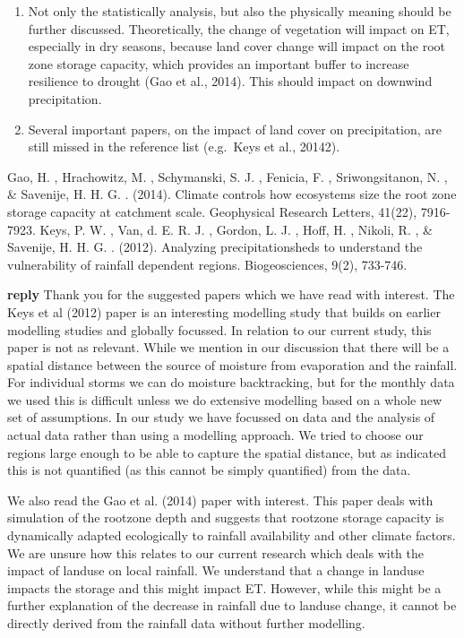 \documentclass[fleqn,10pt,lineno]{wlpeerj} %
\theoremstyle{definition}
\theoremstyle{definition}
\theoremstyle{definition}
\theoremstyle{remark}
\begin{document}
\begin{enumerate}
\def\labelenumi{\arabic{enumi}.}
\item
  Not only the statistically analysis, but also the physically meaning
  should be further discussed. Theoretically, the change of vegetation
  will impact on ET, especially in dry seasons, because land cover
  change will impact on the root zone storage capacity, which provides
  an important buffer to increase resilience to drought (Gao et al.,
  2014). This should impact on downwind precipitation.
\item
  Several important papers, on the impact of land cover on
  precipitation, are still missed in the reference list (e.g.~Keys et
  al., 20142).
\end{enumerate}

Gao, H. , Hrachowitz, M. , Schymanski, S. J. , Fenicia, F. ,
Sriwongsitanon, N. , \& Savenije, H. H. G. . (2014). Climate controls
how ecosystems size the root zone storage capacity at catchment scale.
Geophysical Research Letters, 41(22), 7916-7923. Keys, P. W. , Van, d.
E. R. J. , Gordon, L. J. , Hoff, H. , Nikoli, R. , \& Savenije, H. H. G.
. (2012). Analyzing precipitationsheds to understand the vulnerability
of rainfall dependent regions. Biogeosciences, 9(2), 733-746.

\textbf{reply} Thank you for the suggested papers which we have read
with interest. The Keys et al (2012) paper is an interesting modelling
study that builds on earlier modelling studies and globally focussed. In
relation to our current study, this paper is not as relevant. While we
mention in our discussion that there will be a spatial distance between
the source of moisture from evaporation and the rainfall. For individual
storms we can do moisture backtracking, but for the monthly data we used
this is difficult unless we do extensive modelling based on a whole new
set of assumptions. In our study we have focussed on data and the
analysis of actual data rather than using a modelling approach. We tried
to choose our regions large enough to be able to capture the spatial
distance, but as indicated this is not quantified (as this cannot be
simply quantified) from the data.

We also read the Gao et al. (2014) paper with interest. This paper deals
with simulation of the rootzone depth and suggests that rootzone storage
capacity is dynamically adapted ecologically to rainfall availability
and other climate factors.\\
We are unsure how this relates to our current research which deals with
the impact of landuse on local rainfall. We understand that a change in
landuse impacts the storage and this might impact ET. However, while
this might be a further explanation of the decrease in rainfall due to
landuse change, it cannot be directly derived from the rainfall data
without further modelling.
\end{document}
